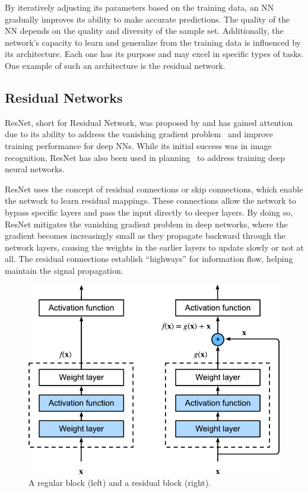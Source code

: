 By iteratively adjusting its parameters based on the training data, an NN gradually improves its ability to make accurate predictions. The quality of the NN depends on the quality and diversity of the sample set. Additionally, the network's capacity to learn and generalize from the training data is influenced by its architecture. Each one has its purpose and may excel in specific types of tasks. One example of such an architecture is the residual network.

\subsection{Residual Networks}
\label{sec:resnets}

ResNet, short for Residual Network, was proposed by \citet{he2016deep} and has gained attention due to its ability to address the vanishing gradient problem~\cite{hochreiter1998vanishing} and improve training performance for deep NNs. While its initial success was in image recognition, ResNet has also been used in planning~\cite{agostinelli2019solving,ferber2022neural} to address training deep neural networks.

ResNet uses the concept of residual connections or skip connections, which enable the network to learn residual mappings. These connections allow the network to bypass specific layers and pass the input directly to deeper layers. By doing so, ResNet mitigates the vanishing gradient problem in deep networks, where the gradient becomes increasingly small as they propagate backward through the network layers, causing the weights in the earlier layers to update slowly or not at all. The residual connections establish ``highways'' for information flow, helping maintain the signal propagation.

\begin{figure}[ht]
    \caption[A regular block and a residual block.]{A regular block (left) and a residual block (right).}
    \label{fig:residual-block}
    \addmargin
    \centering
    \includegraphics[width=0.75\linewidth]{figures/residual-block.pdf}
\end{figure}

